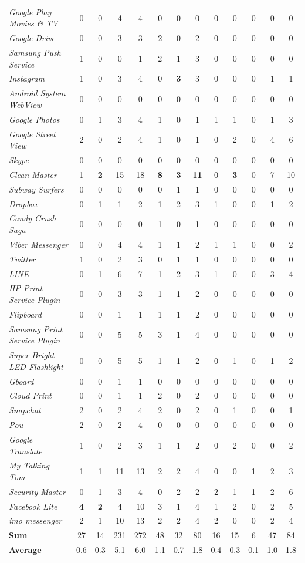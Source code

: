 \documentclass[sigconf,review, anonymous]{acmart}
\begin{document}
\begin{table} [htbp]
\begin{tabular}{|l|cccc|ccc|ccccc|}
{\it Google Play Movies \& TV}&0&0&4&4&0&0&0&0&0&0&0&0\\
{\it Google Drive}&0&0&3&3&2&0&2&0&0&0&0&0\\
{\it Samsung Push Service}&1&0&0&1&2&1&3&0&0&0&0&0\\
{\it Instagram}&1&0&3&4&0&{\bf 3}&3&0&0&0&1&1\\
{\it Android System WebView}&0&0&0&0&0&0&0&0&0&0&0&0\\
{\it Google Photos}&0&1&3&4&1&0&1&1&1&0&1&3\\
{\it Google Street View}&2&0&2&4&1&0&1&0&2&0&4&6\\
{\it Skype}&0&0&0&0&0&0&0&0&0&0&0&0\\
{\it Clean Master}&1&{\bf 2}&15&18&{\bf 8}&{\bf 3}&{\bf 11}&0&{\bf 3}&0&7&10\\
{\it Subway Surfers}&0&0&0&0&0&1&1&0&0&0&0&0\\
{\it Dropbox}&0&1&1&2&1&2&3&1&0&0&1&2\\
{\it Candy Crush Saga}&0&0&0&0&1&0&1&0&0&0&0&0\\
{\it Viber Messenger}&0&0&4&4&1&1&2&1&1&0&0&2\\
{\it Twitter}&1&0&2&3&0&1&1&0&0&0&0&0\\
{\it LINE}&0&1&6&7&1&2&3&1&0&0&3&4\\
{\it HP Print Service Plugin}&0&0&3&3&1&1&2&0&0&0&0&0\\
{\it Flipboard}&0&0&1&1&1&1&2&0&0&0&0&0\\
{\it Samsung Print Service Plugin}&0&0&5&5&3&1&4&0&0&0&0&0\\
{\it Super-Bright LED Flashlight}&0&0&5&5&1&1&2&0&1&0&1&2\\
{\it Gboard}&0&0&1&1&0&0&0&0&0&0&0&0\\
{\it Cloud Print}&0&0&1&1&2&0&2&0&0&0&0&0\\
{\it Snapchat}&2&0&2&4&2&0&2&0&1&0&0&1\\
{\it Pou}&2&0&2&4&0&0&0&0&0&0&0&0\\
{\it Google Translate}&1&0&2&3&1&1&2&0&2&0&0&2\\
{\it My Talking Tom}&1&1&11&13&2&2&4&0&0&1&2&3\\
{\it Security Master}&0&1&3&4&0&2&2&2&1&1&2&6\\
{\it Facebook Lite}&{\bf 4}&{\bf 2}&4&10&3&1&4&1&2&0&2&5\\
{\it imo messenger}&2&1&10&13&2&2&4&2&0&0&2&4\\
\hline
{\bf Sum}&27&14&231&272&48&32&80&16&15&6&47&84\\
\hline
{\bf Average}&0.6&0.3&5.1&6.0&1.1&0.7&1.8&0.4&0.3&0.1&1.0&1.8\\
\hline
\end{tabular}\label{tab_result}
\end{table}
\end{document}
